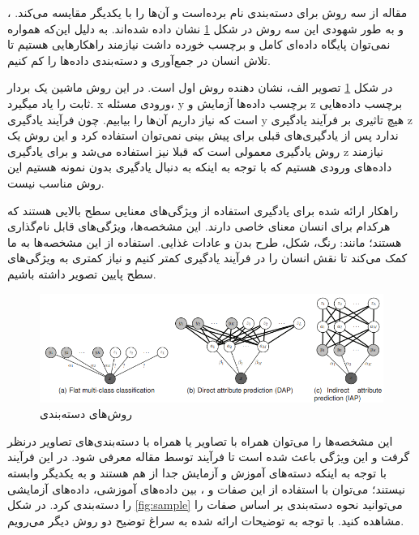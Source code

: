 مقاله از سه روش برای دسته‌بندی نام برده‌است و آن‌ها را با یکدیگر مقایسه می‌کند.	
،
 و 
به طور شهودی این سه روش در شکل 
\ref{fig:learning-methods}
نشان داده شده‌اند.
به دلیل این‌که همواره نمی‌توان پایگاه داده‌ای کامل و برچسب خورده داشت نیازمند راهکار‌هایی هستیم تا تلاش انسان در جمع‌آوری و دسته‌بندی‌ داده‌ها را کم کنیم.

در شکل
\ref{fig:learning-methods}
تصویر الف، نشان دهنده روش اول است. در این روش ماشین یک بردار ثابت را یاد میگیرد. x ورودی مسئله، y برچسب‌ داده‌ها آزمایش و z برچسب داده‌هایی است که نیاز داریم آن‌ها را بیابیم. چون فرآيند یادگیری y هیچ تاثیری بر فرآیند یادگیری z ندارد پس از یادگیری‌های قبلی برای پیش بینی نمی‌توان استفاده کرد و این روش یک روش یادگیری معمولی است که قبلا نیز استفاده می‌شد و برای یادگیری z نیازمند داده‌های ورودی هستیم که با توجه به اینکه به دنبال یادگیری بدون نمونه هستیم این روش مناسب نیست.

راهکار ارائه شده برای یادگیری استفاده از ویژگی‌های معنایی سطح بالایی هستند که هرکدام برای انسان معنای خاصی دارند. این مشخصه‌ها، ویژگی‌های قابل نام‌گذاری هستند؛ مانند: رنگ، شکل، طرح بدن و عادات غذایی. استفاده از این مشخصه‌‌ها به ما کمک می‌کند تا نقش انسان را در فرآیند یادگیری کمتر کنیم و نیاز کمتری به ویژگی‌های سطح پایین تصویر داشته باشیم.

\begin{figure}[b]
	
	\centering
	\includegraphics[width=\textwidth]{img/report/learning-methods}
	\caption{روش‌های دسته‌بندی \cite{Lampert2014}}
	\label{fig:learning-methods}
	\centering
\end{figure}

\newpage
این مشخصه‌ها را می‌توان همراه با تصاویر یا همراه با دسته‌بندی‌های تصاویر درنظر گرفت و این ویژگی باعث شده است تا فرآیند 
توسط مقاله معرفی شود. در این فرآیند با توجه به اینکه دسته‌های آموزش و آزمایش جدا از هم هستند و به یکدیگر وابسته نیستند؛ می‌توان با استفاده از این صفات و 
،
 بین داده‌های آموزشی، داده‌های آزمایشی را دسته‌بندی کرد. در شکل 
\ref{fig:sample}
می‌توانید نحوه دسته‌بندی بر اساس صفات را مشاهده کنید.
با توجه به توضیحات ارائه شده به سراغ توضیح دو روش دیگر می‌رویم.
